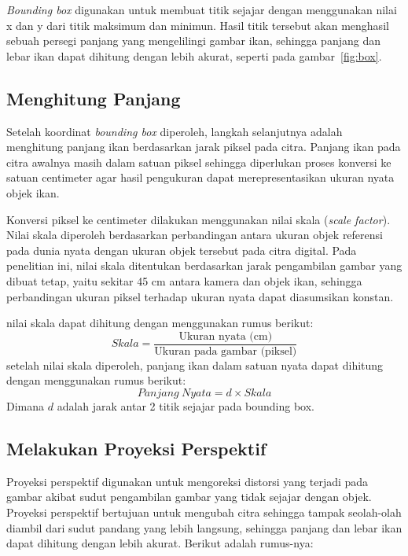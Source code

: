     \emph{Bounding box} digunakan untuk membuat titik  sejajar dengan menggunakan nilai x dan y dari titik maksimum dan minimun. Hasil titik tersebut akan menghasil sebuah persegi panjang yang mengelilingi gambar ikan, 
sehingga panjang dan lebar ikan dapat dihitung dengan lebih akurat, seperti pada gambar~\ref{fig:box}.

\subsection{Menghitung Panjang}
Setelah koordinat \emph{bounding box} diperoleh, langkah selanjutnya adalah menghitung panjang ikan berdasarkan jarak piksel pada citra. 
Panjang ikan pada citra awalnya masih dalam satuan piksel sehingga diperlukan proses konversi ke satuan centimeter agar hasil pengukuran dapat merepresentasikan ukuran nyata objek ikan.

Konversi piksel ke centimeter dilakukan menggunakan nilai skala (\emph{scale factor}). 
Nilai skala diperoleh berdasarkan perbandingan antara ukuran objek referensi pada dunia nyata dengan ukuran objek tersebut pada citra digital. 
Pada penelitian ini, nilai skala ditentukan berdasarkan jarak pengambilan gambar yang dibuat tetap, yaitu sekitar 45 cm antara kamera dan objek ikan, sehingga perbandingan ukuran piksel terhadap ukuran nyata dapat diasumsikan konstan.

nilai skala dapat dihitung dengan menggunakan rumus berikut:
\begin{equation*}
    Skala = \frac{\text{Ukuran nyata (cm)}}{\text{Ukuran pada gambar (piksel)}}
\end{equation*}
setelah nilai skala diperoleh, panjang ikan dalam satuan nyata dapat dihitung dengan menggunakan rumus berikut:
\begin{equation}
    Panjang\ Nyata = d \times Skala
\end{equation}
    Dimana \(d\) adalah jarak antar 2 titik sejajar pada bounding box.

\subsection{Melakukan Proyeksi Perspektif}
    Proyeksi perspektif digunakan untuk mengoreksi distorsi yang terjadi pada gambar akibat sudut pengambilan gambar yang tidak sejajar dengan objek. Proyeksi perspektif bertujuan untuk mengubah citra sehingga tampak seolah-olah diambil dari sudut pandang yang lebih langsung, sehingga panjang dan lebar ikan dapat dihitung dengan lebih akurat. Berikut adalah rumus-nya:

